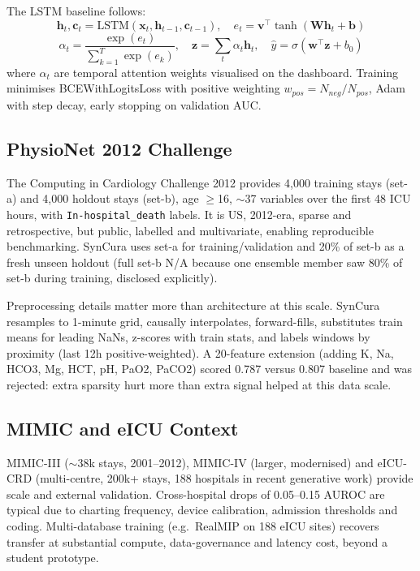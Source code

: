 \documentclass[a4paper,conference]{IEEEtran}
\begin{document}
The LSTM baseline follows:
\begin{equation}
\mathbf{h}_t, \mathbf{c}_t = \mathrm{LSTM}(\mathbf{x}_t, \mathbf{h}_{t-1}, \mathbf{c}_{t-1}), \quad e_t = \mathbf{v}^\top \tanh(\mathbf{W}\mathbf{h}_t + \mathbf{b})
\end{equation}
\begin{equation}
\alpha_t = \frac{\exp(e_t)}{\sum_{k=1}^{T}\exp(e_k)}, \quad \mathbf{z} = \sum_{t}\alpha_t \mathbf{h}_t, \quad \hat{y} = \sigma(\mathbf{w}^\top \mathbf{z} + b_0)
\end{equation}
where $\alpha_t$ are temporal attention weights visualised on the dashboard. Training minimises BCEWithLogitsLoss with positive weighting $w_{pos}=N_{neg}/N_{pos}$, Adam with step decay, early stopping on validation AUC.

\subsection{PhysioNet 2012 Challenge}
The Computing in Cardiology Challenge 2012 provides 4,000 training stays (set-a) and 4,000 holdout stays (set-b), age $\ge$16, $\sim$37 variables over the first 48 ICU hours, with {\tt In-hospital\_death} labels. It is US, 2012-era, sparse and retrospective, but public, labelled and multivariate, enabling reproducible benchmarking. SynCura uses set-a for training/validation and 20\% of set-b as a fresh unseen holdout (full set-b N/A because one ensemble member saw 80\% of set-b during training, disclosed explicitly).

Preprocessing details matter more than architecture at this scale. SynCura resamples to 1-minute grid, causally interpolates, forward-fills, substitutes train means for leading NaNs, z-scores with train stats, and labels windows by proximity (last 12h positive-weighted). A 20-feature extension (adding K, Na, HCO3, Mg, HCT, pH, PaO2, PaCO2) scored 0.787 versus 0.807 baseline and was rejected: extra sparsity hurt more than extra signal helped at this data scale.

\subsection{MIMIC and eICU Context}
MIMIC-III ($\sim$38k stays, 2001--2012), MIMIC-IV (larger, modernised) and eICU-CRD (multi-centre, 200k+ stays, 188 hospitals in recent generative work) provide scale and external validation. Cross-hospital drops of 0.05--0.15 AUROC are typical due to charting frequency, device calibration, admission thresholds and coding. Multi-database training (e.g.\ RealMIP on 188 eICU sites) recovers transfer at substantial compute, data-governance and latency cost, beyond a student prototype.
\end{document}
